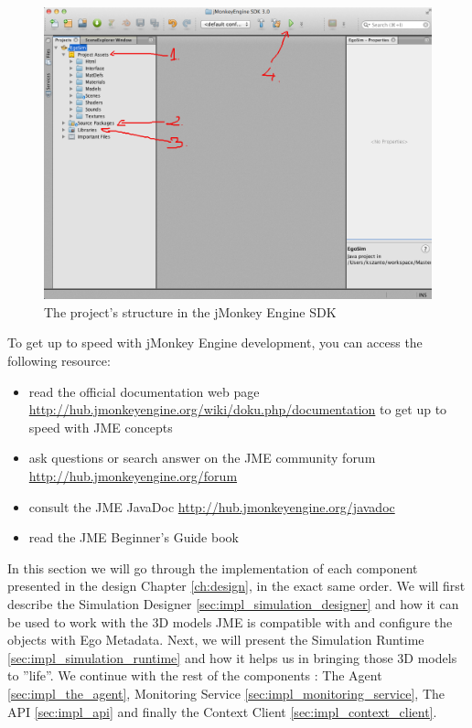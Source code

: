 \begin{figure}[H]
	\centering
	\includegraphics[width=\linewidth]{gfx/Chapter4/project_structure_in_sdk}
	\caption{The project's structure in the jMonkey Engine SDK}
	\label{fig:egosim_structure}
\end{figure}

To get up to speed with jMonkey Engine development, you can access the following resource:
\begin{itemize}
	\item read the official documentation web page \url{http://hub.jmonkeyengine.org/wiki/doku.php/documentation} to get up to speed with JME concepts
	\item ask questions or search answer on the JME community forum \url{http://hub.jmonkeyengine.org/forum}
	\item consult the JME JavaDoc \url{http://hub.jmonkeyengine.org/javadoc}
	\item read the JME Beginner's Guide book \cite{kusterer2013jmonkeyengine}
\end{itemize}

In this section we will go through the implementation of each component presented in the design Chapter \ref{ch:design}, in the exact same order. We will first describe the Simulation Designer \ref{sec:impl_simulation_designer} and how it can be used to work with the 3D models JME is compatible with and configure the objects with Ego Metadata. Next, we will present the Simulation Runtime \ref{sec:impl_simulation_runtime} and how it helps us in bringing those 3D models to ''life''. We continue with the rest of the components : The Agent \ref{sec:impl_the_agent}, Monitoring Service \ref{sec:impl_monitoring_service}, The API \ref{sec:impl_api} and finally the Context Client \ref{sec:impl_context_client}.\\

